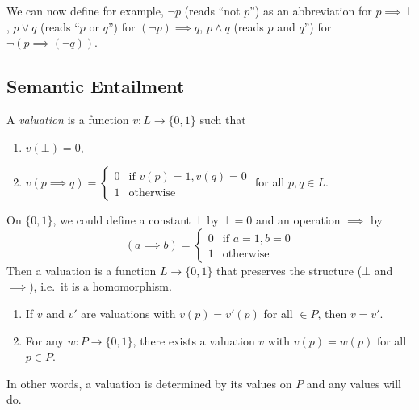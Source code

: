 \documentclass[a4paper]{article}
\begin{document}
We can now define for example, \(\neg p\) (reads ``not \(p\)'') as an abbreviation for \(p \implies \bot\), \(p \lor q\) (reads ``\(p\) or \(q\)'') for \((\neg p) \implies q\), \(p \land q\) (reads \(p\) and \(q\)'') for \(\neg (p \implies (\neg q))\).

\subsection{Semantic Entailment}

\begin{definition}[Valuation]
  A \emph{valuation} is a function \(v: L \to \{0, 1\}\) such that
  \begin{enumerate}
  \item \(v(\bot) = 0\),
  \item \(v(p \implies q) = \begin{cases} 0 & \text{if } v(p) = 1, v(q) = 0 \\ 1 & \text{otherwise} \end{cases}\) for all \(p, q \in L\).
  \end{enumerate}
\end{definition}

\begin{remark}
  On \(\{0, 1\}\), we could define a constant \(\bot\) by \(\bot = 0\) and an operation \(\implies\) by
  \[
    (a \implies b) =
    \begin{cases}
      0 & \text{if } a = 1, b = 0 \\
      1 & \text{otherwise}
    \end{cases}
  \]
  Then a valuation is a function \(L \to \{0, 1\}\) that preserves the structure (\(\bot\) and \(\implies\)), i.e.\ it is a homomorphism.
\end{remark}

\begin{proposition}\leavevmode
  \begin{enumerate}
  \item If \(v\) and \(v'\) are valuations with \(v(p) = v'(p)\) for all \( \in P\), then \(v = v'\).
  \item For any \(w: P \to \{0, 1\}\), there exists a valuation \(v\) with \(v(p) = w(p)\) for all \(p \in P\).
  \end{enumerate}
\end{proposition}

In other words, a valuation is determined by its values on \(P\) and any values will do.
\end{document}
